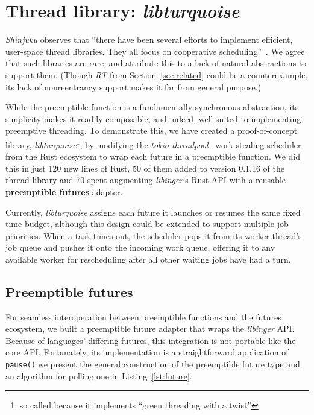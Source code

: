 \section{Thread library: \textit{libturquoise}}
\label{sec:libturquoise}

\textit{Shinjuku} observes that ``there have been several efforts to implement
efficient, user-space thread libraries.  They all focus on cooperative
scheduling''~\cite{Kaffes:nsdi2019}.  We agree that such libraries are rare, and
attribute this to a lack of natural abstractions to support them.  (Though
\textit{RT} from Section~\ref{sec:related} could be a counterexample, its lack of
nonreentrancy support makes it far from general purpose.)

While the preemptible function is a fundamentally synchronous abstraction, its
simplicity makes it readily composable, and indeed, well-suited to implementing
preemptive threading.  To demonstrate this, we have created a
proof-of-concept library, \textit{libturquoise}\footnote{so called because it
implements ``green threading with a twist''}, by modifying the
\textit{tokio-threadpool}~\cite{www-tokio-threadpool} work-stealing scheduler from
the Rust ecosystem to wrap each future in a preemptible function.  We did this in
just 120 new lines of Rust, 50 of them added to version 0.1.16 of the thread library
and
70 spent augmenting \textit{libinger}'s Rust API with a reusable \textbf{preemptible
futures} adapter.

Currently, \textit{libturquoise} assigns each future it launches or resumes the same
fixed time budget, although this design could be extended to support
multiple job priorities.  When a task times out, the scheduler pops it from its
worker thread's job queue and pushes it onto the incoming work queue,
offering it to any available worker for rescheduling after all other waiting jobs
have had a turn.


\subsection{Preemptible futures}

For seamless interoperation between preemptible functions and the futures ecosystem,
we built a preemptible future adapter that wraps the \textit{libinger} API.  Because
of languages' differing futures, this integration is not portable like the core API.
Fortunately, its implementation is a straightforward application of
\texttt{pause()}:\@ we present the general construction of the preemptible future
type and an algorithm for polling one in Listing~\ref{lst:future}.

